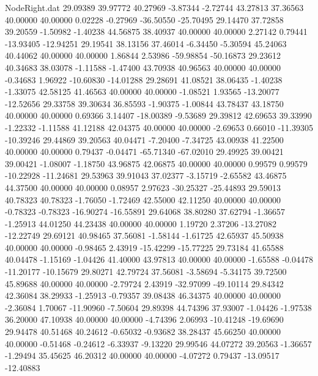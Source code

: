 \begin{filecontents}{NodeRight.dat}
  29.09389   39.97772   40.27969    -3.87344   -2.72744   43.27813   37.36563   40.00000   40.00000    0.02228   -0.27969  -36.50550  -25.70495
  29.14470   37.72858   39.20559    -1.50982   -1.40238   44.56875   38.40937   40.00000   40.00000    2.27142    0.79441  -13.93405  -12.94251
  29.19541   38.13156   37.46014    -6.34450   -5.30594   45.24063   40.44062   40.00000   40.00000    1.86844    2.53986  -59.98854  -50.16873
  29.23612   40.34683   38.03078    -1.11588   -1.47400   43.70938   40.96563   40.00000   40.00000   -0.34683    1.96922  -10.60830  -14.01288
  29.28691   41.08521   38.06435    -1.40238   -1.33075   42.58125   41.46563   40.00000   40.00000   -1.08521    1.93565  -13.20077  -12.52656
  29.33758   39.30634   36.85593    -1.90375   -1.00844   43.78437   43.18750   40.00000   40.00000    0.69366    3.14407  -18.00389   -9.53689
  29.39812   42.69653   39.33990    -1.22332   -1.11588   41.12188   42.04375   40.00000   40.00000   -2.69653    0.66010  -11.39305  -10.39246
  29.44869   39.20563   40.04471    -7.20400   -7.34725   43.00938   41.22500   40.00000   40.00000    0.79437   -0.04471  -65.71340  -67.02010
  29.49925   39.00421   39.00421    -1.08007   -1.18750   43.96875   42.06875   40.00000   40.00000    0.99579    0.99579  -10.22928  -11.24681
  29.53963   39.91043   37.02377    -3.15719   -2.65582   43.46875   44.37500   40.00000   40.00000    0.08957    2.97623  -30.25327  -25.44893
  29.59013   40.78323   40.78323    -1.76050   -1.72469   42.55000   42.11250   40.00000   40.00000   -0.78323   -0.78323  -16.90274  -16.55891
  29.64068   38.80280   37.62794    -1.36657   -1.25913   44.01250   44.23438   40.00000   40.00000    1.19720    2.37206  -13.27082  -12.22749
  29.69121   40.98465   37.56081    -1.58144   -1.61725   42.65937   45.50938   40.00000   40.00000   -0.98465    2.43919  -15.42299  -15.77225
  29.73184   41.65588   40.04478    -1.15169   -1.04426   41.40000   43.97813   40.00000   40.00000   -1.65588   -0.04478  -11.20177  -10.15679
  29.80271   42.79724   37.56081    -3.58694   -5.34175   39.72500   45.89688   40.00000   40.00000   -2.79724    2.43919  -32.97099  -49.10114
  29.84342   42.36084   38.29933    -1.25913   -0.79357   39.08438   46.34375   40.00000   40.00000   -2.36084    1.70067  -11.90960   -7.50604
  29.89398   44.74396   37.93007    -1.04426   -1.97538   36.20000   47.10938   40.00000   40.00000   -4.74396    2.06993  -10.41248  -19.69690
  29.94478   40.51468   40.24612    -0.65032   -0.93682   38.28437   45.66250   40.00000   40.00000   -0.51468   -0.24612   -6.33937   -9.13220
  29.99546   44.07272   39.20563    -1.36657   -1.29494   35.45625   46.20312   40.00000   40.00000   -4.07272    0.79437  -13.09517  -12.40883

\end{filecontents}
